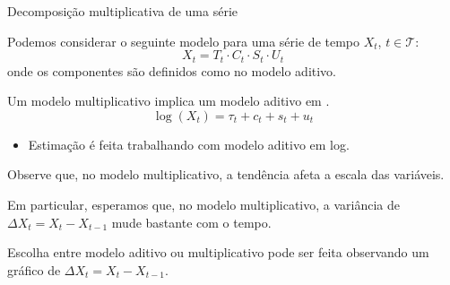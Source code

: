 \documentclass[11pt]{beamer}
\newenvironment{halfwideitemize}{\itemize\addtolength{\itemsep}{0.5em}}{\enditemize}
\begin{document}
\begin{frame}{Decomposição multiplicativa de uma série}
	\begin{halfwideitemize}
		\item Podemos considerar o seguinte modelo para uma série de tempo $X_t$, $t \in \mathcal{T}$:
		\begin{equation}
			X_t = 	T_t \cdot C_t \cdot S_t \cdot U_t
		\end{equation}
		onde os componentes são definidos como no modelo aditivo.
		\item Um modelo multiplicativo implica um modelo aditivo em .
		\begin{equation}
			\log(X_t) = \tau_t + c_t + s_t + u_t
		\end{equation}
		\vspace{-1em}
		\begin{itemize}
			\item Estimação é feita trabalhando com modelo aditivo em log.
		\end{itemize}
		\item Observe que, no modelo multiplicativo, a tendência afeta a {\color{blue}escala} das variáveis.
		\begin{halfwideitemize}
			\item Em particular, esperamos que, no modelo multiplicativo, a variância de $\Delta X_t = X_{t} - X_{t-1}$ mude bastante com o tempo.
			\item Escolha entre modelo aditivo ou multiplicativo pode ser feita observando um gráfico de $\Delta X_t = X_{t} - X_{t-1}$.
		\end{halfwideitemize}
	\end{halfwideitemize}
\end{frame}
\end{document}
